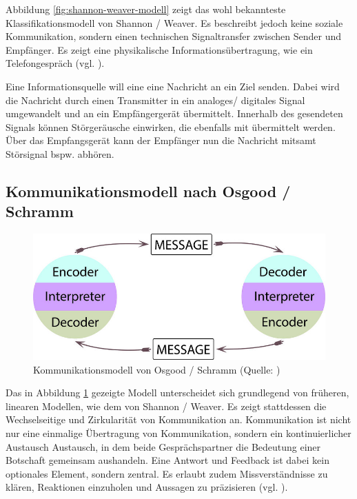 Abbildung \ref{fig:shannon-weaver-modell} zeigt das wohl bekannteste Klassifikationsmodell von Shannon / Weaver. Es beschreibt jedoch keine soziale Kommunikation, sondern einen technischen Signaltransfer zwischen Sender und Empfänger. Es zeigt eine physikalische Informationsübertragung, wie ein Telefongespräch (vgl. \cite[S. 92]{scheufele_kommunikationstheorien_2004}). 

Eine Informationsquelle will eine eine Nachricht an ein Ziel senden. Dabei wird die Nachricht durch einen Transmitter in ein analoges/ digitales Signal umgewandelt und an ein Empfängergerät übermittelt. Innerhalb des gesendeten Signals können Störgeräusche einwirken, die ebenfalls mit übermittelt werden. Über das Empfangsgerät kann der Empfänger nun die Nachricht mitsamt Störsignal bspw. abhören.

\subsection{Kommunikationsmodell nach Osgood / Schramm}

\begin{figure}[ht]
\centering
\includegraphics[width=1\linewidth]{content/pictures/osgood-schramm.jpg}
\caption{Kommunikationsmodell von Osgood / Schramm (Quelle: \cite{wrench_24_2021})}
\label{fig:osgood-schramm-modell}
\end{figure}

Das in Abbildung \ref{fig:osgood-schramm-modell} gezeigte Modell unterscheidet sich grundlegend von früheren, linearen Modellen, wie dem von Shannon / Weaver. Es zeigt stattdessen die Wechselseitige und Zirkularität von Kommunikation an. Kommunikation ist nicht nur eine einmalige Übertragung von Kommunikation, sondern ein kontinuierlicher Austausch Austausch, in dem beide Gesprächspartner die Bedeutung einer Botschaft gemeinsam aushandeln. Eine Antwort und Feedback ist dabei kein optionales Element, sondern zentral. Es erlaubt zudem Missverständnisse zu klären, Reaktionen einzuholen und Aussagen zu präzisieren (vgl. \cite{noauthor_osgood_2024}). 

